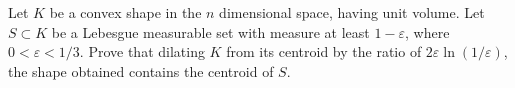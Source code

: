Let $K$ be a convex shape in the $n$ dimensional space, having unit volume. Let $S \subset K$ be a Lebesgue measurable set with measure at least $1-\varepsilon$, where $0<\varepsilon<1/3$. Prove that dilating $K$ from its centroid by the ratio of $2\varepsilon \ln(1/\varepsilon)$, the shape obtained contains the centroid of $S$.